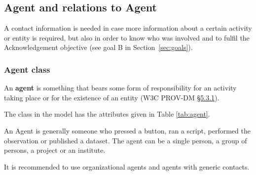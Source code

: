 \subsection{Agent and relations to Agent}
\label{sec:agent+relations}

A contact information is needed in case more information about a certain activity or entity is required, but also in order to know who was involved and to fulfil the Acknowledgement objective (see goal B in Section~\ref{sec:goals}).


\subsubsection{Agent class}
\label{sec:agent}

An \textbf{agent} is something that bears some form of responsibility for an activity taking place or for the existence of an entity (W3C PROV-DM \href{https://www.w3.org/TR/prov-dm/#term-agent}{\S5.3.1}).

The  class in the model has the attributes given in Table \ref{tab:agent}. 

An Agent is generally someone who pressed a button, ran a script, performed the observation or published a dataset. The agent can be a single person, a group of persons, a project or an institute. 

It is recommended to use organizational agents and agents with generic contacts.



